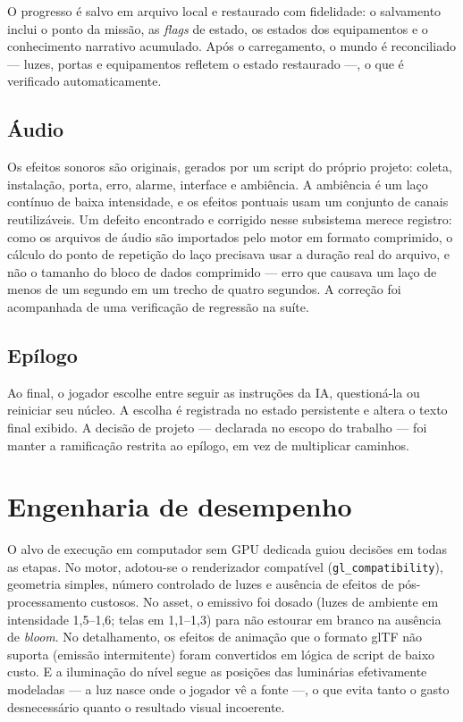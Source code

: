 O progresso é salvo em arquivo local e restaurado com fidelidade: o
salvamento inclui o ponto da missão, as \emph{flags} de estado, os estados
dos equipamentos e o conhecimento narrativo acumulado. Após o carregamento, o
mundo é reconciliado --- luzes, portas e equipamentos refletem o estado
restaurado ---, o que é verificado automaticamente.

\subsection{Áudio}

Os efeitos sonoros são originais, gerados por um script do próprio projeto:
coleta, instalação, porta, erro, alarme, interface e ambiência. A ambiência é
um laço contínuo de baixa intensidade, e os efeitos pontuais usam um conjunto
de canais reutilizáveis. Um defeito encontrado e corrigido nesse subsistema
merece registro: como os arquivos de áudio são importados pelo motor em
formato comprimido, o cálculo do ponto de repetição do laço precisava usar a
duração real do arquivo, e não o tamanho do bloco de dados comprimido --- erro
que causava um laço de menos de um segundo em um trecho de quatro segundos. A
correção foi acompanhada de uma verificação de regressão na suíte.

\subsection{Epílogo}

Ao final, o jogador escolhe entre seguir as instruções da IA, questioná-la ou
reiniciar seu núcleo. A escolha é registrada no estado persistente e altera o
texto final exibido. A decisão de projeto --- declarada no escopo do trabalho
--- foi manter a ramificação restrita ao epílogo, em vez de multiplicar
caminhos.

\section{Engenharia de desempenho}
\label{sec:desempenho_dev}

O alvo de execução em computador sem GPU dedicada guiou decisões em todas as
etapas. No motor, adotou-se o renderizador compatível
(\texttt{gl\_compatibility}), geometria simples, número controlado de luzes e
ausência de efeitos de pós-processamento custosos. No asset, o emissivo foi
dosado (luzes de ambiente em intensidade 1,5--1,6; telas em 1,1--1,3) para
não estourar em branco na ausência de \emph{bloom}. No detalhamento, os
efeitos de animação que o formato glTF não suporta (emissão intermitente)
foram convertidos em lógica de script de baixo custo. E a iluminação do nível
segue as posições das luminárias efetivamente modeladas --- a luz nasce onde
o jogador vê a fonte ---, o que evita tanto o gasto desnecessário quanto o
resultado visual incoerente.

